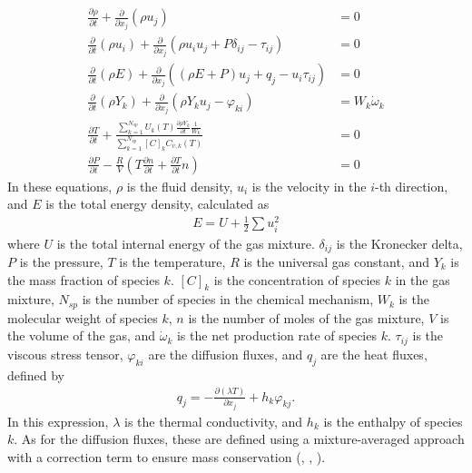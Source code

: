 \begin{align}
\frac{\partial \rho}{\partial t} + \frac{\partial}{\partial x_{j}}(\rho u_{j}) &= 0 \label{eq:consmass} \\
\frac{\partial}{\partial t}(\rho u_{i}) + \frac{\partial}{\partial x_{j}}(\rho u_{i} u_{j} + P\delta_{ij} - \tau_{ij}) &= 0 \label{eq:consmom} \\
\frac{\partial}{\partial t}(\rho E) + \frac{\partial}{\partial x_{j}}((\rho E + P)u_{j} + q_{j} - u_{i}\tau_{ij}) &= 0 \label{eq:conse} \\
\frac{\partial}{\partial t}(\rho Y_{k}) + \frac{\partial}{\partial x_{j}}(\rho Y_{k} u_{j} - \varphi_{ki}) &= W_{k}\dot{\omega}_{k} \label{eq:conssp}\\
\frac{\partial T}{\partial t} + \frac{\sum_{k=1}^{N_{sp}}U_{k}(T)\frac{\partial \rho Y_{k}}{\partial t}\frac{1}{W_{k}}}{\sum_{k=1}^{N_{sp}}[C]_{k}C_{v,k}(T)} &= 0 \label{eq:temp} \\
\frac{\partial P}{\partial t} - \frac{R}{V}(T\frac{\partial n}{\partial t} + \frac{\partial T}{\partial t}n) &= 0 \label{eq:pres}
\end{align}
In these equations, $\rho$ is the fluid density, $u_{i}$ is the velocity in the $i$-th direction, and $E$ is the total energy density,
calculated as
\begin{align}
E = U + \frac{1}{2} \sum u_{i}^{2}
\end{align}
where $U$ is the total internal energy of the gas mixture.
$\delta_{ij}$ is the Kronecker delta, $P$ is the pressure, $T$ is the temperature, $R$ is the universal gas constant, and $Y_{k}$ is the mass fraction of
species $k$. $[C]_{k}$ is the concentration of species $k$ in the gas mixture, $N_{sp}$ is the number of species
in the chemical mechanism, $W_{k}$ is the molecular weight of species $k$, $n$ is the number of moles of the gas
mixture, $V$ is the volume of the gas, and $\dot{\omega}_{k}$ is the net production rate of species $k$. $\tau_{ij}$
is the viscous stress tensor, $\varphi_{ki}$ are the diffusion fluxes, and $q_{j}$ are the heat fluxes, defined by
\begin{align}
q_{j} = - \frac{\partial (\lambda T)}{\partial x_{j}} + h_{k}\varphi_{kj}.
\end{align}
In this expression, $\lambda$ is the thermal conductivity, and $h_{k}$ is the enthalpy of species $k$.
As for the diffusion fluxes, these are defined using a mixture-averaged approach with a
correction term to ensure mass conservation (\cite{smooke2013computation}, \cite{poinsot2005theoretical}, \cite{kee2005chemically}).
